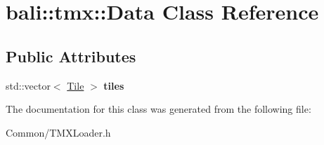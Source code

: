 \hypertarget{classbali_1_1tmx_1_1_data}{\section{bali\-:\-:tmx\-:\-:Data Class Reference}
\label{classbali_1_1tmx_1_1_data}
}
\subsection*{Public Attributes}
\begin{DoxyCompactItemize}
\item 
\hypertarget{classbali_1_1tmx_1_1_data_afed01deeca908ccb6cc1452d1682a3bf}{std\-::vector$<$ \hyperlink{classbali_1_1tmx_1_1_tile}{Tile} $>$ {\bfseries tiles}}\label{classbali_1_1tmx_1_1_data_afed01deeca908ccb6cc1452d1682a3bf}

\end{DoxyCompactItemize}


The documentation for this class was generated from the following file\-:\begin{DoxyCompactItemize}
\item 
Common/T\-M\-X\-Loader.\-h\end{DoxyCompactItemize}
